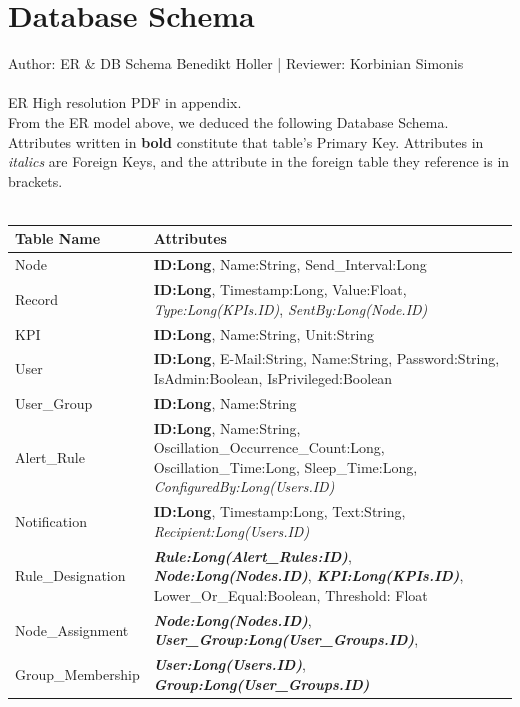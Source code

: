 \documentclass{scrreprt}
\begin{document}


\label{er}

\section{Database Schema}
Author: ER \& DB Schema Benedikt Holler | Reviewer: Korbinian Simonis\\ \\
ER High resolution PDF in appendix. \\
From the ER model above, we deduced the following Database Schema. \\ 
Attributes written in \textbf{bold} constitute that table's Primary Key. Attributes in \emph{italics} are Foreign Keys, and the attribute in the foreign table they reference is in brackets.\\ \\
\begin{tabularx}{15cm}{l|X}
	\hline 
\textbf{Table Name}	& \textbf{Attributes} \\ 
	\hline 
Node	&\textbf{ID:Long}, Name:String,  Send\_Interval:Long  \\ 
	\hline 
Record	& \textbf{ID:Long}, Timestamp:Long, Value:Float, \emph{Type:Long(KPIs.ID)}, \emph{SentBy:Long(Node.ID)} \\ 	
	\hline
KPI & \textbf{ID:Long}, Name:String, Unit:String \\
	\hline
User	& \textbf{ID:Long}, E-Mail:String, Name:String, Password:String, IsAdmin:Boolean, IsPrivileged:Boolean \\ 
	\hline 
User\_Group	&\textbf{ID:Long}, Name:String  \\ 
	\hline 
Alert\_Rule	&\textbf{ID:Long}, Name:String, Oscillation\_Occurrence\_Count:Long, Oscillation\_Time:Long, Sleep\_Time:Long,  \emph{ConfiguredBy:Long(Users.ID)}  \\ 
	\hline 
Notification	&\textbf{ID:Long}, Timestamp:Long, Text:String, \emph{Recipient:Long(Users.ID)} \\
\hline 
Rule\_Designation & \textbf{\emph{Rule:Long(Alert\_Rules:ID)}}, \textbf{\emph{Node:Long(Nodes.ID)}}, \textbf{\emph{KPI:Long(KPIs.ID)}}, Lower\_Or\_Equal:Boolean, Threshold: Float \\ 
	\hline 
Node\_Assignment	&\textbf{\emph{Node:Long(Nodes.ID)}}, \textbf{\emph{User\_Group:Long(User\_Groups.ID)}},   \\ 
	\hline 
Group\_Membership	&\textbf{\emph{User:Long(Users.ID)}}, \textbf{\emph{Group:Long(User\_Groups.ID)}}  \\ 
	\hline 
\end{tabularx} 
\end{document}
